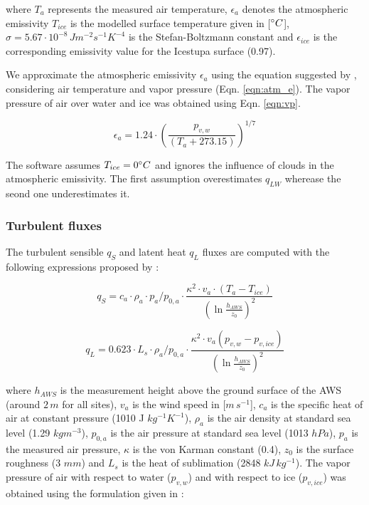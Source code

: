 \documentclass[utf8]{frontiersSCNS}
\begin{document}
where $T_a$ represents the measured air temperature, $\epsilon_a$ denotes the atmospheric emissivity $T_{ice}$
is the modelled surface temperature given in [$\degree C$], $\sigma=5.67\cdot10^{-8}\,Jm^{-2}s^{-1}K^{-4}$ is
the Stefan-Boltzmann constant and $\epsilon_{ice}$ is the corresponding emissivity value for the Icestupa
surface (0.97).

We approximate the atmospheric emissivity $\epsilon_a$ using the equation suggested by \cite{Brutsaert_1975},
considering air temperature and vapor pressure (Eqn. \ref{eqn:atm_e}). The vapor pressure of air over water and
ice was obtained using Eqn. \ref{eqn:vp}.  

\begin{equation}
	\epsilon_a=1.24 \cdot (\frac{p_{v,w}}{(T_a+273.15)})^{1/7} \label{eqn:atm_e}
\end{equation}

The software assumes $T_{ice} = 0 \degree C$ and ignores the influence of clouds in the atmospheric emissivity.
The first assumption overestimates $q_{LW}$ wherease the seond one underestimates it.  

\subsubsection{Turbulent fluxes} \label{sec:Qs}

The turbulent sensible $q_{S}$ and latent heat $q_{L}$ fluxes are computed with the following expressions
proposed by \cite{Garratt_1992}:

\begin{equation}
	q_{S}= c_{a} \cdot \rho_{a} \cdot p_{a}/p_{0,a} \cdot \frac{\kappa^2 \cdot v_a \cdot
		(T_a-T_{ice})}{{(\ln{\frac{h_{AWS}}{z_{0}}})}^2}
	\label{eqn:qs}
\end{equation}

\begin{equation}
	q_{L}= 0.623 \cdot L_s \cdot \rho_{a}/p_{0,a} \cdot \frac{\kappa^2 \cdot
	v_a(p_{v,w}-p_{v,ice})}{{(\ln{\frac{h_{AWS}}{z_{0}}})}^2}
\end{equation}

where $h_{AWS}$ is the measurement height above the ground surface of the AWS (around $2\,m$ for all sites),
$v_a$ is the wind speed in [$m\,s^{-1}$], $c_a$ is the specific heat of air at constant pressure (1010 J
$kg^{-1} K^{-1}$), $\rho_{a}$ is the air density at standard sea level (1.29 $kg m^{-3}$), $p_{0,a}$ is the air
pressure at standard sea level (1013 $hPa$), $p_{a}$ is the measured air pressure, $\kappa$ is the von Karman
constant (0.4), $z_{0}$ is the surface roughness (3 $mm$) and $L_s$ is the heat of sublimation (2848
$kJ\,kg^{-1}$).  The vapor pressure of air with respect to water ($p_{v,w}$) and with respect to ice
($p_{v,ice}$) was obtained using the formulation given in \cite{huang_2018} :
\end{document}
